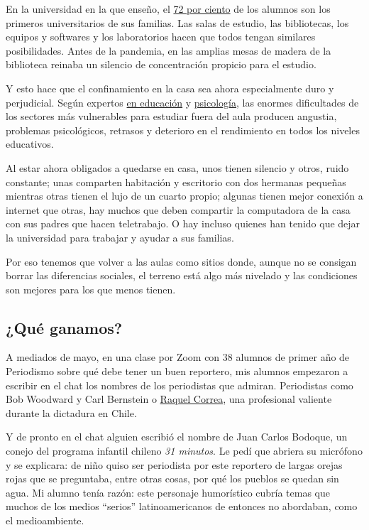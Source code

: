 En la universidad en la que enseño, el
\href{https://www.uahurtado.cl/wp-images/uploads/2019/08/Memoria-UAH-2018_-por-pagina.pdf}{72
por ciento} de los alumnos son los primeros universitarios de sus
familias. Las salas de estudio, las bibliotecas, los equipos y softwares
y los laboratorios hacen que todos tengan similares posibilidades. Antes
de la pandemia, en las amplias mesas de madera de la biblioteca reinaba
un silencio de concentración propicio para el estudio.

Y esto hace que el confinamiento en la casa sea ahora especialmente duro
y perjudicial. Según expertos
\href{https://blogs.worldbank.org/es/education/educational-challenges-and-opportunities-covid-19-pandemic}{en
educación} y
\href{https://www.uchile.cl/noticias/162982/academicos-uch-exponen-los-problemas-de-la-educacion-remota-en-el-pais}{psicología},
las enormes dificultades de los sectores más vulnerables para estudiar
fuera del aula producen angustia, problemas psicológicos, retrasos y
deterioro en el rendimiento en todos los niveles educativos.

Al estar ahora obligados a quedarse en casa, unos tienen silencio y
otros, ruido constante; unas comparten habitación y escritorio con dos
hermanas pequeñas mientras otras tienen el lujo de un cuarto propio;
algunas tienen mejor conexión a internet que otras, hay muchos que deben
compartir la computadora de la casa con sus padres que hacen
teletrabajo. O hay incluso quienes han tenido que dejar la universidad
para trabajar y ayudar a sus familias.

Por eso tenemos que volver a las aulas como sitios donde, aunque no se
consigan borrar las diferencias sociales, el terreno está algo más
nivelado y las condiciones son mejores para los que menos tienen.

\hypertarget{quuxe9-ganamos}{%
\subsection{¿Qué ganamos?}\label{quuxe9-ganamos}}

A mediados de mayo, en una clase por Zoom con 38 alumnos de primer año
de Periodismo sobre qué debe tener un buen reportero, mis alumnos
empezaron a escribir en el chat los nombres de los periodistas que
admiran. Periodistas como Bob Woodward y Carl Bernstein o
\href{https://www.uc.cl/universidad/premios-nacionales/raquel-correa-prats/}{Raquel
Correa}, una profesional valiente durante la dictadura en Chile.

Y de pronto en el chat alguien escribió el nombre de Juan Carlos
Bodoque, un conejo del programa infantil chileno \emph{31 minutos}. Le
pedí que abriera su micrófono y se explicara: de niño quiso ser
periodista por este reportero de largas orejas rojas que se preguntaba,
entre otras cosas, por qué los pueblos se quedan sin agua. Mi alumno
tenía razón: este personaje humorístico cubría temas que muchos de los
medios ``serios'' latinoamericanos de entonces no abordaban, como el
medioambiente.

